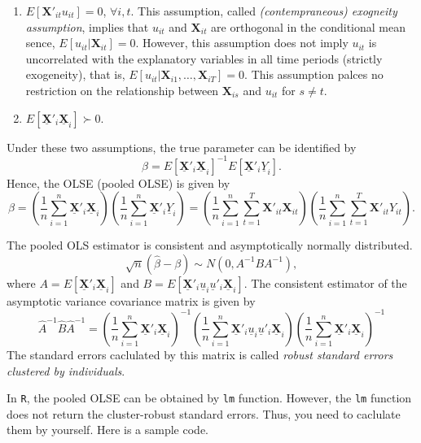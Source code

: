 \documentclass[
  12pt,
]{article}
\providecommand{\tightlist}{%
  \setlength{\itemsep}{0pt}\setlength{\parskip}{0pt}}
\begin{document}
\begin{enumerate}
\def\labelenumi{\arabic{enumi}.}
\tightlist
\item
  \(E[\mathbf{X}'_{it}u_{it}] = 0\), \(\forall i, t\). This assumption,
  called \emph{(contempraneous) exogneity assumption}, implies that
  \(u_{it}\) and \(\mathbf{X}_{it}\) are orthogonal in the conditional
  mean sence, \(E[u_{it} | \mathbf{X}_{it}] = 0\). However, this
  assumption does not imply \(u_{it}\) is uncorrelated with the
  explanatory variables in all time periods (strictly exogeneity), that
  is, \(E[u_{it} | \mathbf{X}_{i1}, \ldots, \mathbf{X}_{iT}] = 0\). This
  assumption palces no restriction on the relationship between
  \(\mathbf{X}_{is}\) and \(u_{it}\) for \(s\not=t\).
\item
  \(E[\underline{\mathbf{X}}'_i\underline{\mathbf{X}}_i] \succ 0\).
\end{enumerate}

Under these two assumptions, the true parameter can be identified by \[
  \beta = E[\underline{\mathbf{X}}'_i\underline{\mathbf{X}}_i]^{-1} E[\underline{\mathbf{X}}'_i\underline{Y}_i].
\] Hence, the OLSE (pooled OLSE) is given by \[
  \hat{\beta} 
  = \left( \frac{1}{n} \sum_{i=1}^n \underline{\mathbf{X}}'_i\underline{\mathbf{X}}_i \right)
  \left( \frac{1}{n} \sum_{i=1}^n \underline{\mathbf{X}}'_i\underline{Y}_i \right)
  = \left( \frac{1}{n} \sum_{i=1}^n \sum_{t=1}^T \mathbf{X}'_{it} \mathbf{X}_{it} \right)
  \left( \frac{1}{n} \sum_{i=1}^n \sum_{t=1}^T \mathbf{X}'_{it} Y_{it} \right).
\]

The pooled OLS estimator is consistent and asymptotically normally
distributed. \[
  \sqrt{n}(\hat{\beta} - \beta) \sim N(0, A^{-1} B A^{-1}),
\] where \(A = E[\underline{\mathbf{X}}'_i\underline{\mathbf{X}}_i]\)
and
\(B = E[\underline{\mathbf{X}}'_i \underline{u}_i \underline{u}'_i \underline{\mathbf{X}}_i]\).
The consistent estimator of the asymptotic variance covariance matrix is
given by \[
  \hat{A}^{-1} \hat{B} \hat{A}^{-1} = 
  \left( \frac{1}{n} \sum_{i=1}^n \underline{\mathbf{X}}'_i\underline{\mathbf{X}}_i \right)^{-1}
  \left( \frac{1}{n} \sum_{i=1}^n \underline{\mathbf{X}}'_i \underline{u}_i \underline{u}'_i \underline{\mathbf{X}}_i \right)
  \left( \frac{1}{n} \sum_{i=1}^n \underline{\mathbf{X}}'_i\underline{\mathbf{X}}_i \right)^{-1}
\] The standard errors caclulated by this matrix is called \emph{robust
standard errors clustered by individuals}.

In \texttt{R}, the pooled OLSE can be obtained by \texttt{lm} function.
However, the \texttt{lm} function does not return the cluster-robust
standard errors. Thus, you need to caclulate them by yourself. Here is a
sample code.
\end{document}
